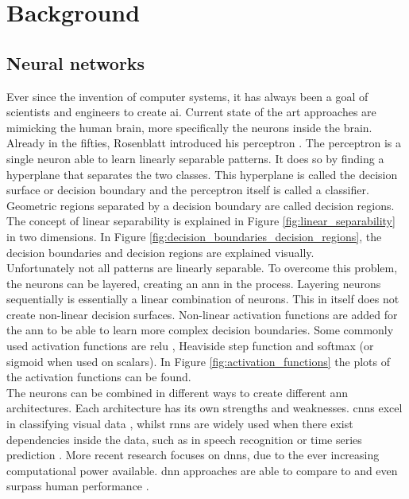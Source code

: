 \chapter{Background}
\section{Neural networks}
Ever since the invention of computer systems, it has always been a goal of scientists and engineers to create \gls{ai}. Current state of the art approaches are mimicking the human brain, more specifically the neurons inside the brain. Already in the fifties, Rosenblatt introduced his perceptron \cite{rosenblatt_perceptron_1958}. The perceptron is a single neuron able to learn linearly separable patterns. It does so by finding a hyperplane that separates the two classes. This hyperplane is called the decision surface or decision boundary and the perceptron itself is called a classifier. Geometric regions separated by a decision boundary are called decision regions. The concept of linear separability is explained in Figure \ref{fig:linear_separability} in two dimensions. In Figure \ref{fig:decision_boundaries_decision_regions}, the decision boundaries and decision regions are explained visually. \\

Unfortunately not all patterns are linearly separable. To overcome this problem, the neurons can be layered, creating an \gls{ann} in the process. Layering neurons sequentially is essentially a linear combination of neurons. This in itself does not create non-linear decision surfaces. Non-linear activation functions are added for the \gls{ann} to be able to learn more complex decision boundaries. Some commonly used activation functions are \gls{relu} \cite{relu}, Heaviside step function and softmax (or sigmoid when used on scalars). In Figure \ref{fig:activation_functions} the plots of the activation functions can be found.\\ 

The neurons can be combined in different ways to create different \gls{ann} architectures. Each architecture has its own strengths and weaknesses. \glspl{cnn} excel in classifying visual data \cite{cnn_1, cnn_2}, whilst \glspl{rnn} are widely used when there exist dependencies inside the data, such as in speech recognition \cite{speech_1, speech_2} or time series prediction \cite{time_series_1}. More recent research focuses on \glspl{dnn}, due to the ever increasing computational power available. \gls{dnn} approaches are able to compare to and even surpass human performance \cite{alpha_go_google, imagenet_dnn}.\\ 

